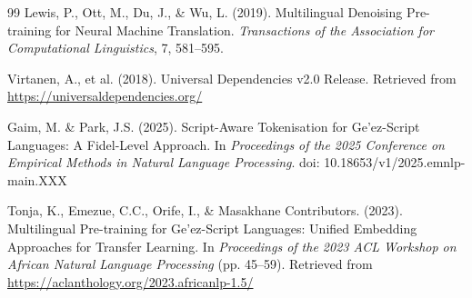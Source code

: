 \documentclass[12pt,a4paper]{article}
\theoremstyle{plain}
\theoremstyle{definition}
\begin{document}
\begin{thebibliography}{99}
Lewis, P., Ott, M., Du, J., \& Wu, L. (2019).
Multilingual Denoising Pre-training for Neural Machine Translation.
\textit{Transactions of the Association for Computational Linguistics}, 7, 581--595.

Virtanen, A., et al. (2018).
Universal Dependencies v2.0 Release.
Retrieved from \url{https://universaldependencies.org/}

Gaim, M. \& Park, J.S. (2025).
Script-Aware Tokenisation for Ge'ez-Script Languages: A Fidel-Level Approach.
In \textit{Proceedings of the 2025 Conference on Empirical Methods in Natural Language Processing}.
doi: 10.18653/v1/2025.emnlp-main.XXX

Tonja, K., Emezue, C.C., Orife, I., \& Masakhane Contributors. (2023).
Multilingual Pre-training for Ge'ez-Script Languages: Unified Embedding Approaches for Transfer Learning.
In \textit{Proceedings of the 2023 ACL Workshop on African Natural Language Processing} (pp. 45--59).
Retrieved from \url{https://aclanthology.org/2023.africanlp-1.5/}

\end{thebibliography}

\end{document}
